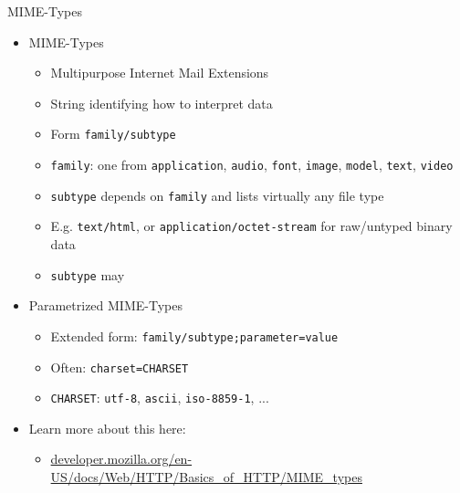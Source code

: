 \begin{frame}{MIME-Types}
%
\begin{itemize}
\item MIME-Types
	\begin{itemize}
	\item Multipurpose Internet Mail Extensions
	\item String identifying how to interpret data
	\item Form \texttt{family/subtype}
	\item \texttt{family}: one from \texttt{application}, \texttt{audio}, \texttt{font}, \texttt{image}, \texttt{model}, \texttt{text}, \texttt{video}
	\item \texttt{subtype} depends on \texttt{family} and lists virtually any file type
	\item E.\;g. \texttt{text/html}, or \texttt{application/octet-stream} for raw/untyped binary data
	\item \texttt{subtype} may
	\end{itemize}
\pause
\item Parametrized MIME-Types
	\begin{itemize}
	\item Extended form: \texttt{{\color{gray}family/subtype}{\color{purple};parameter=value}}
	\item Often: \texttt{charset=CHARSET}
	\item \texttt{CHARSET}: \texttt{utf-8}, \texttt{ascii}, \texttt{iso-8859-1}, ...
	\end{itemize}
\pause
\item Learn more about this here:
	\begin{itemize}
	\item \url{developer.mozilla.org/en-US/docs/Web/HTTP/Basics_of_HTTP/MIME_types}
	\end{itemize}
\end{itemize}
%
\end{frame}



